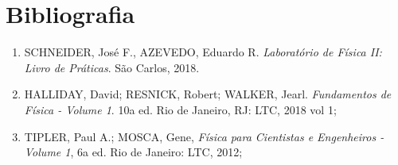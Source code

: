 \newpage
\section{Bibliografia}

\begin{enumerate}
  \item SCHNEIDER, José F., AZEVEDO, Eduardo R. \textit{Laboratório de Física II: Livro de Práticas}. São Carlos, 2018.
  \item HALLIDAY, David; RESNICK, Robert; WALKER, Jearl. \textit{Fundamentos de Física - Volume 1}. 10a ed. Rio de Janeiro, RJ: LTC, 2018 vol 1;
  \item TIPLER, Paul A.; MOSCA, Gene, \textit{Física para Cientistas e Engenheiros - Volume 1}, 6a ed. Rio de Janeiro: LTC, 2012;
  


\end{enumerate}

%
